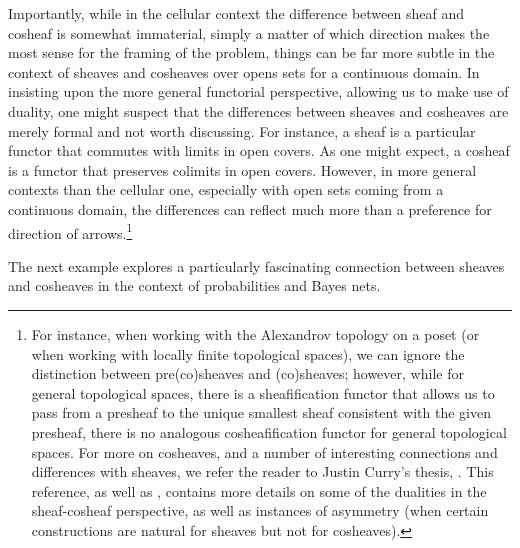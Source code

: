 \documentclass[11pt]{book}
\theoremstyle{definition}
\theoremstyle{definition}
\theoremstyle{definition}
\theoremstyle{theorem}
\theoremstyle{definition}
\begin{document}
Importantly, while in the cellular context the difference between sheaf and cosheaf is somewhat immaterial, simply a matter of which direction makes the most sense for the framing of the problem, things can be far more subtle in the context of sheaves and cosheaves over opens sets for a continuous domain. In insisting upon the more general functorial perspective, allowing us to make use of duality, one might suspect that the differences between sheaves and cosheaves are merely formal and not worth discussing. For instance, a sheaf is a particular functor that commutes with limits in open covers. As one might expect, a cosheaf is a functor that preserves colimits in open covers. However, in more general contexts than the cellular one, especially with open sets coming from a continuous domain, the differences can reflect much more than a preference for direction of arrows.\footnote{For instance, when working with the Alexandrov topology on a poset (or when working with locally finite topological spaces), we can ignore the distinction between pre(co)sheaves and (co)sheaves; however, while for general topological spaces, there is a sheafification functor that allows us to pass from a presheaf to the unique smallest sheaf consistent with the given presheaf, there is no analogous cosheafification functor for general topological spaces. For more on cosheaves, and a number of interesting connections and differences with sheaves, we refer the reader to Justin Curry's thesis, \cite{curry_sheaves_2013}. This reference, as well as \cite{robinson_sheaf_2016}, contains more details on some of the dualities in the sheaf-cosheaf perspective, as well as instances of asymmetry (when certain constructions are natural for sheaves but not for cosheaves).} \par   
The next example explores a particularly fascinating connection between sheaves and cosheaves in the context of probabilities and Bayes nets.   
\end{document}
